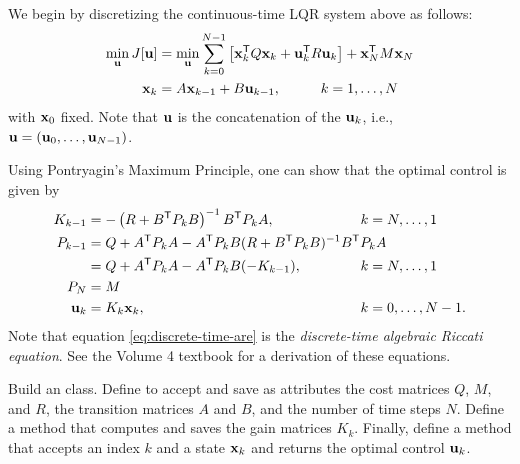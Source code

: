 We begin by discretizing the continuous-time LQR system above as follows:
\begin{align}
\min_{\mathbf{u}} J[\mathbf{u}] &= \min_{\mathbf{u}} \sum_{k=0}^{N-1} \left[\mathbf{x}_k^{\mathsf T} Q \mathbf{x}_k + \mathbf{u}_k^{\mathsf T} R \mathbf{u}_k\right] + \mathbf{x}_N^{\mathsf T} M \mathbf{x}_N\\
\label{eq:discrete-lqr-evolution}
\mathbf{x}_k &= A \mathbf{x}_{k-1} + B \mathbf{u}_{k-1}, \hspace{1cm} k = 1, \ldots, N
\end{align}
with $\mathbf{x}_0$ fixed.
Note that $\mathbf{u}$ is the concatenation of the $\mathbf{u}_k$, i.e., $\mathbf{u} = (\mathbf{u}_0, \ldots, \mathbf{u}_{N-1})$.


Using Pontryagin's Maximum Principle, one can show that the optimal control is given by
\begin{align}
\label{eq:lqr-gain}
K_{k-1} &= - \left(R + B\trp P_k B \right)^{-1} B\trp P_k A, &&\hspace{-1cm}k = N, \ldots, 1\\
\label{eq:discrete-time-are}
P_{k-1} &= Q + A\trp P_k A - A\trp P_k B (R + B\trp P_k B)^{-1} B\trp P_k A\\
\nonumber
&= Q + A\trp P_k A - A\trp P_k B (-K_{k-1}), &&\hspace{-1cm}k = N, \ldots, 1\\
P_N &= M\\
\label{eq:lqr-control}
\u_k &= K_k \x_k, &&\hspace{-1cm}k = 0, \ldots, N-1.
\end{align}
Note that equation \eqref{eq:discrete-time-are} is the \emph{discrete-time algebraic Riccati equation}.
See the Volume 4 textbook for a derivation of these equations.

\begin{problem}
Build an  class.
Define  to accept and save as attributes the cost matrices $Q$, $M$, and $R$, the transition matrices $A$ and $B$, and the number of time steps $N$.
Define a  method that computes and saves the gain matrices $K_k$.
Finally, define a  method that accepts an index $k$ and a state $\mathbf{x}_k$ and returns the optimal control $\mathbf{u}_k$.
\label{prob:lqr-class}
\end{problem}

